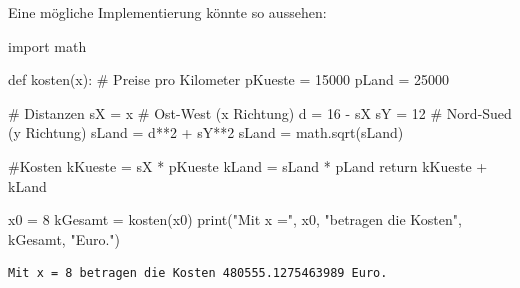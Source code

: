 \documentclass[
  a4paper,
  DIV=11]{scrreprt}
\newenvironment{Shaded}{\begin{snugshade}}{\end{snugshade}}
\newcommand{\BuiltInTok}[1]{\textcolor[rgb]{0.00,0.23,0.31}{#1}}
\newcommand{\CommentTok}[1]{\textcolor[rgb]{0.37,0.37,0.37}{#1}}
\newcommand{\ControlFlowTok}[1]{\textcolor[rgb]{0.00,0.23,0.31}{#1}}
\newcommand{\DecValTok}[1]{\textcolor[rgb]{0.68,0.00,0.00}{#1}}
\newcommand{\ImportTok}[1]{\textcolor[rgb]{0.00,0.46,0.62}{#1}}
\newcommand{\KeywordTok}[1]{\textcolor[rgb]{0.00,0.23,0.31}{#1}}
\newcommand{\NormalTok}[1]{\textcolor[rgb]{0.00,0.23,0.31}{#1}}
\newcommand{\OperatorTok}[1]{\textcolor[rgb]{0.37,0.37,0.37}{#1}}
\newcommand{\StringTok}[1]{\textcolor[rgb]{0.13,0.47,0.30}{#1}}
\theoremstyle{definition}
\theoremstyle{definition}
\theoremstyle{remark}
\begin{document}
\begin{tcolorbox}[enhanced jigsaw, titlerule=0mm, title=\textcolor{quarto-callout-tip-color}{\faLightbulb}\hspace{0.5em}{Lösung}, breakable, coltitle=black, leftrule=.75mm, bottomrule=.15mm, colback=white, rightrule=.15mm, opacitybacktitle=0.6, bottomtitle=1mm, toptitle=1mm, left=2mm, toprule=.15mm, colbacktitle=quarto-callout-tip-color!10!white, colframe=quarto-callout-tip-color-frame, arc=.35mm, opacityback=0]

Eine mögliche Implementierung könnte so aussehen:

\begin{Shaded}
\begin{Highlighting}[]
\ImportTok{import}\NormalTok{ math}

\KeywordTok{def}\NormalTok{ kosten(x):}
    \CommentTok{\# Preise pro Kilometer}
\NormalTok{    pKueste }\OperatorTok{=} \DecValTok{15000} 
\NormalTok{    pLand   }\OperatorTok{=} \DecValTok{25000}

    \CommentTok{\# Distanzen}
\NormalTok{    sX }\OperatorTok{=}\NormalTok{ x  }\CommentTok{\# Ost{-}West (x Richtung)}
\NormalTok{    d }\OperatorTok{=} \DecValTok{16}  \OperatorTok{{-}}\NormalTok{ sX}
\NormalTok{    sY }\OperatorTok{=} \DecValTok{12} \CommentTok{\# Nord{-}Sued (y Richtung)}
\NormalTok{    sLand }\OperatorTok{=}\NormalTok{ d}\OperatorTok{**}\DecValTok{2} \OperatorTok{+}\NormalTok{ sY}\OperatorTok{**}\DecValTok{2}
\NormalTok{    sLand }\OperatorTok{=}\NormalTok{ math.sqrt(sLand)}

    \CommentTok{\#Kosten}
\NormalTok{    kKueste }\OperatorTok{=}\NormalTok{ sX }\OperatorTok{*}\NormalTok{ pKueste}
\NormalTok{    kLand }\OperatorTok{=}\NormalTok{ sLand }\OperatorTok{*}\NormalTok{ pLand}
    \ControlFlowTok{return}\NormalTok{ kKueste }\OperatorTok{+}\NormalTok{ kLand}

\NormalTok{x0 }\OperatorTok{=} \DecValTok{8}
\NormalTok{kGesamt }\OperatorTok{=}\NormalTok{ kosten(x0)}
\BuiltInTok{print}\NormalTok{(}\StringTok{"Mit x ="}\NormalTok{, x0, }\StringTok{"betragen die Kosten"}\NormalTok{, kGesamt, }\StringTok{"Euro."}\NormalTok{)}
\end{Highlighting}
\end{Shaded}

\begin{verbatim}
Mit x = 8 betragen die Kosten 480555.1275463989 Euro.
\end{verbatim}

\end{tcolorbox}
\end{document}

